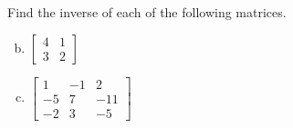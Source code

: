 \documentclass[../main.tex]{subfiles}
\begin{document}
Find the inverse of each of the following matrices.
\begin{enumerate}[a)]
	\setcounter{enumi}{1}
	\item 
		$\left[\begin{array}{rr}
			4 & 1 \\
			3 & 2
		\end{array}\right]$
	\setcounter{enumi}{3}
	\item 
		$\left[\begin{array}{rrr}
			1 & -1 & 2 \\
			-5 & 7 & -11 \\
			-2 & 3 & -5
		\end{array}\right]$
\end{enumerate}
\end{document}
